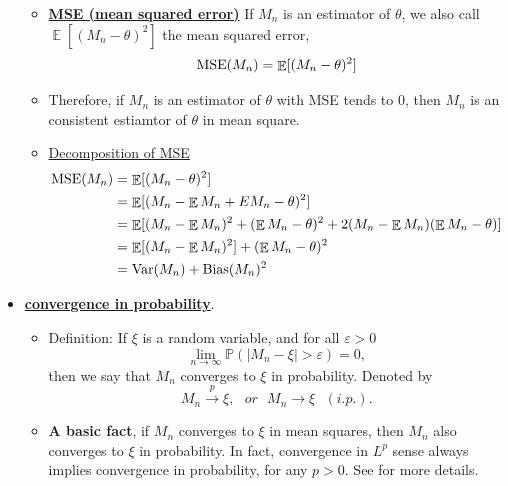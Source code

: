 \documentclass[19pt,landscaoe]{article}
\DeclareMathOperator{\E}{\mathbb{E}}
\DeclareMathOperator{\Var}{\mathrm{Var}}
\begin{document}
\begin{itemize}
\begin{itemize}
\newpage


\item \underline{\textbf{MSE (mean squared error)}} If $ M_n $ is an estimator of $ \theta $, we also call $\E [(M_n - \theta)^2] $ the mean squared error,
    \begin{align*}
      {\rm MSE}(M_n) = \E [(M_n - \theta)^2] 
    \end{align*}

\item Therefore, if $ M_n $ is an estimator of $ \theta $ with MSE tends to 0, then $ M_n $ is an consistent estiamtor of $ \theta $ in mean square.
    

\item \underline{Decomposition of MSE} 
    \begin{align*}
      {\rm MSE}(M_n) &= \E [(M_n - \theta)^2] \\
               & = \E [(M_n - \E M_n +E M_n- \theta)^2] \\
               & = \E [(M_n - \E M_n)^2 + (\E M_n- \theta)^2 + 2 (M_n - \E M_n)(  \E M_n- \theta)]  \\
               & = \E [(M_n - \E M_n)^2] + (\E M_n- \theta)^2   \\
               &= \Var(M_n) + {\rm Bias}(M_n)^2
    \end{align*}
   

\end{itemize}





\newpage


\item \underline{\bf convergence in probability}. 

\begin{itemize}

\item Definition: If  $ \xi $ is a random variable, and for all $\varepsilon>0$
$$
\lim _{n \rightarrow \infty} \mathbb{P}\left(\left|M_n-\xi \right|>\varepsilon\right)=0,
$$
then we say that $M_n$ converges to $ \xi $ in probability. Denoted by
$$
M_n \stackrel{p}{\rightarrow} \xi, \ \ \ 
or
\ \ \ 
M_n {\rightarrow} \xi \ \ \  (i.p.).
$$

\item {\bf A basic fact}, if $M_n $ converges to $ \xi $ in mean squares, then $M_n $ also converges to $ \xi $ in probability. In fact, convergence in $L^p$ sense always implies convergence in probability, for any $p>0$. See \cite[Theorem~4.1.4]{chung00} for more details. 
    

\end{itemize}
\end{itemize}
\end{document}
